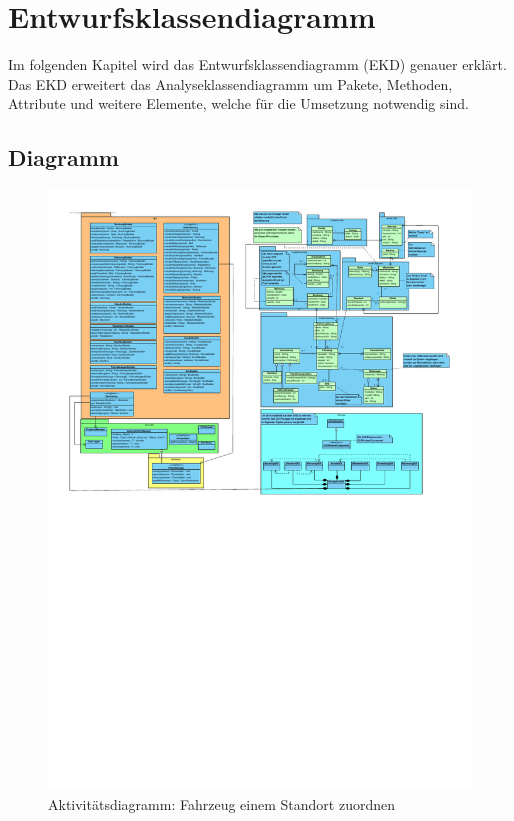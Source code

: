 \chapter{Entwurfsklassendiagramm}

Im folgenden Kapitel wird das Entwurfsklassendiagramm (EKD) genauer erklärt. Das EKD erweitert das Analyseklassendiagramm um Pakete, Methoden, Attribute und weitere Elemente, welche für die Umsetzung notwendig sind.

\section{Diagramm}

\begin{figure}[!ht]
    \centering
    \includegraphics[width=\textwidth, trim = 0cm 13cm 0cm 0cm]{Bilder/Diagramme/Entwurfsklassendiagramm_v2.pdf}
    \caption{Aktivitätsdiagramm: Fahrzeug einem Standort zuordnen}
    \label{img:ekd}
\end{figure}

